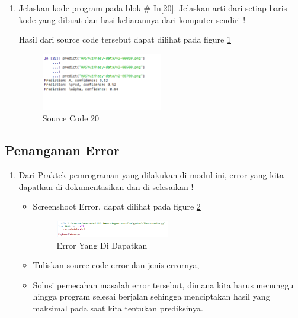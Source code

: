 \begin{enumerate}
\item Jelaskan kode program pada blok \# In[20]. Jelaskan arti dari setiap baris kode yang dibuat dan hasi keliarannya dari komputer sendiri !
	
	\subitem Hasil dari source code tersebut dapat dilihat pada figure \ref{YNC7-28}
	\begin{figure}[!htbp!]
		\centerline{\includegraphics[width=0.5\textwidth]{figures/YN/Chapter7/YNC7-28.png}}
		\caption{Source Code 20}
		\label{YNC7-28}
	\end{figure}

\end{enumerate}

\subsection{Penanganan Error}
\begin{enumerate}

\item Dari Praktek pemrograman yang dilakukan di modul ini, error yang kita dapatkan di dokumentasikan dan di selesaikan !
	\begin{itemize}

	\item Screenshoot Error, dapat dilihat pada figure \ref{YNC7-29}
	
	\begin{figure}[!htbp!]
		\centerline{\includegraphics[width=0.5\textwidth]{figures/YN/Chapter7/YNC7-29.png}}
		\caption{Error Yang Di Dapatkan}
		\label{YNC7-29}
	\end{figure}

	\item Tuliskan source code error dan jenis errornya,
	

	\item Solusi pemecahan masalah error tersebut, dimana kita harus menunggu hingga program selesai berjalan sehingga menciptakan hasil yang maksimal pada saat kita tentukan prediksinya.
		
	\end{itemize}
\end{enumerate}